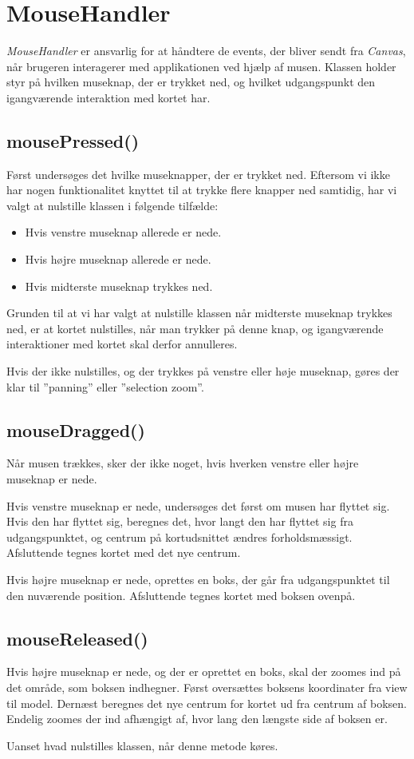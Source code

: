 \section{MouseHandler}
\emph{MouseHandler} er ansvarlig for at håndtere de events, der bliver sendt fra \emph{Canvas}, når brugeren interagerer med applikationen ved hjælp af musen. Klassen holder styr på hvilken museknap, der er trykket ned, og hvilket udgangspunkt den igangværende interaktion med kortet har.

\subsection{mousePressed()}
Først undersøges det hvilke museknapper, der er trykket ned. Eftersom vi ikke har nogen funktionalitet knyttet til at trykke flere knapper ned samtidig, har vi valgt at nulstille klassen i følgende tilfælde:

\begin{itemize}
	\item Hvis venstre museknap allerede er nede.
	\item Hvis højre museknap allerede er nede.
	\item Hvis midterste museknap trykkes ned.
\end{itemize}

Grunden til at vi har valgt at nulstille klassen når midterste museknap trykkes ned, er at kortet nulstilles, når man trykker på denne knap, og igangværende interaktioner med kortet skal derfor annulleres.

Hvis der ikke nulstilles, og der trykkes på venstre eller høje museknap, gøres der klar til ''panning'' eller ''selection zoom''.

\subsection{mouseDragged()}
Når musen trækkes, sker der ikke noget, hvis hverken venstre eller højre museknap er nede.

Hvis venstre museknap er nede, undersøges det først om musen har flyttet sig. Hvis den har flyttet sig, beregnes det, hvor langt den har flyttet sig fra udgangspunktet, og centrum på kortudsnittet ændres forholdsmæssigt. Afsluttende tegnes kortet med det nye centrum.

Hvis højre museknap er nede, oprettes en boks, der går fra udgangspunktet til den nuværende position. Afsluttende tegnes kortet med boksen ovenpå.

\subsection{mouseReleased()}
Hvis højre museknap er nede, og der er oprettet en boks, skal der zoomes ind på det område, som boksen indhegner. Først oversættes boksens koordinater fra view til model. Dernæst beregnes det nye centrum for kortet ud fra centrum af boksen. Endelig zoomes der ind afhængigt af, hvor lang den længste side af boksen er.

Uanset hvad nulstilles klassen, når denne metode køres.